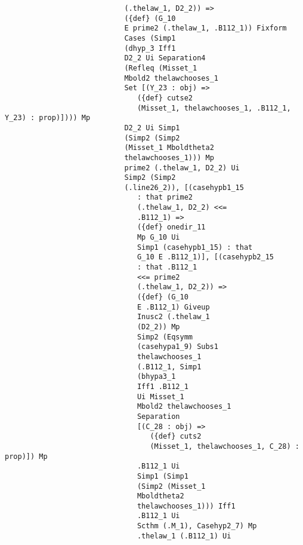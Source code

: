 \documentclass[12pt]{article}
\begin{document}
\begin{verbatim}
                            (.thelaw_1, D2_2)) => 
                            ({def} (G_10 
                            E prime2 (.thelaw_1, .B112_1)) Fixform 
                            Cases (Simp1 
                            (dhyp_3 Iff1 
                            D2_2 Ui Separation4 
                            (Refleq (Misset_1 
                            Mbold2 thelawchooses_1 
                            Set [(Y_23 : obj) => 
                               ({def} cutse2 
                               (Misset_1, thelawchooses_1, .B112_1, Y_23) : prop)]))) Mp 
                            D2_2 Ui Simp1 
                            (Simp2 (Simp2 
                            (Misset_1 Mboldtheta2 
                            thelawchooses_1))) Mp 
                            prime2 (.thelaw_1, D2_2) Ui 
                            Simp2 (Simp2 
                            (.line26_2)), [(casehypb1_15 
                               : that prime2 
                               (.thelaw_1, D2_2) <<= 
                               .B112_1) => 
                               ({def} onedir_11 
                               Mp G_10 Ui 
                               Simp1 (casehypb1_15) : that 
                               G_10 E .B112_1)], [(casehypb2_15 
                               : that .B112_1 
                               <<= prime2 
                               (.thelaw_1, D2_2)) => 
                               ({def} (G_10 
                               E .B112_1) Giveup 
                               Inusc2 (.thelaw_1 
                               (D2_2)) Mp 
                               Simp2 (Eqsymm 
                               (casehypa1_9) Subs1 
                               thelawchooses_1 
                               (.B112_1, Simp1 
                               (bhypa3_1 
                               Iff1 .B112_1 
                               Ui Misset_1 
                               Mbold2 thelawchooses_1 
                               Separation 
                               [(C_28 : obj) => 
                                  ({def} cuts2 
                                  (Misset_1, thelawchooses_1, C_28) : prop)]) Mp 
                               .B112_1 Ui 
                               Simp1 (Simp1 
                               (Simp2 (Misset_1 
                               Mboldtheta2 
                               thelawchooses_1))) Iff1 
                               .B112_1 Ui 
                               Scthm (.M_1), Casehyp2_7) Mp 
                               .thelaw_1 (.B112_1) Ui 

\end{verbatim}
\end{document}

